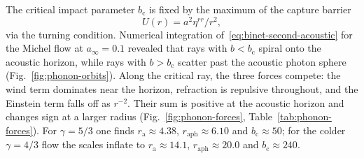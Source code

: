 \documentclass[12pt,a4paper,preprint]{elsarticle}
\begin{document}
            The critical impact parameter $b_{\mathrm{c}}$ is fixed by the maximum of the capture barrier
            \begin{equation}
                U(r) = a^{2}\eta^{rr}/r^{2} ,
                \label{eq:capture-barrier}
            \end{equation}
            via the turning condition. Numerical integration of~\eqref{eq:binet-second-acoustic} for the Michel flow at $a_{\infty}=0.1$ revealed that rays with $b<b_{\mathrm{c}}$ spiral onto the acoustic horizon, while rays with $b>b_{\mathrm{c}}$ scatter past the acoustic photon sphere (Fig.~\ref{fig:phonon-orbits}). Along the critical ray, the three forces compete: the wind term dominates near the horizon, refraction is repulsive throughout, and the Einstein term falls off as $r^{-2}$. Their sum is positive at the acoustic horizon and changes sign at a larger radius (Fig.~\ref{fig:phonon-forces}, Table~\ref{tab:phonon-forces}). For $\gamma=5/3$ one finds $r_{\mathrm{a}}\approx 4.38$, $r_{\mathrm{aph}}\approx 6.10$ and $b_{\mathrm{c}}\approx 50$; for the colder $\gamma=4/3$ flow the scales inflate to $r_{\mathrm{a}}\approx 14.1$, $r_{\mathrm{aph}}\approx 20.0$ and $b_{\mathrm{c}}\approx 240$.
\end{document}
